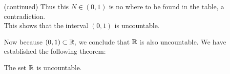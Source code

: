 \documentclass{beamer}
\begin{document}
\begin{frame}[plain]
  \begin{block}{(continued)}
    Thus this $N\in(0,1)$ is no where to be found in the table,
    a contradiction.\\[0.3cm]

    This shows that the interval $(0,1)$ is uncountable.
  \end{block}

  \pause
  Now because $(0,1)\subset\R$, we conclude that $\R$ is also uncountable.
  We have established the following theorem:
  \pause
  \begin{theorem}
    The set $\R$ is uncountable.
  \end{theorem}

\end{frame}
\end{document}
